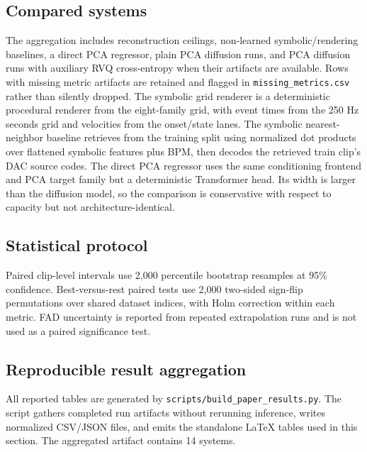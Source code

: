 \subsection{Compared systems}
The aggregation includes reconstruction ceilings, non-learned symbolic/rendering baselines, a direct PCA regressor, plain PCA diffusion runs, and PCA diffusion runs with auxiliary RVQ cross-entropy when their artifacts are available. Rows with missing metric artifacts are retained and flagged in \texttt{missing\_metrics.csv} rather than silently dropped.
The symbolic grid renderer is a deterministic procedural renderer from the eight-family grid, with event times from the 250 Hz seconds grid and velocities from the onset/state lanes. The symbolic nearest-neighbor baseline retrieves from the training split using normalized dot products over flattened symbolic features plus BPM, then decodes the retrieved train clip's DAC source codes.
The direct PCA regressor uses the same conditioning frontend and PCA target family but a deterministic Transformer head. Its width is larger than the diffusion model, so the comparison is conservative with respect to capacity but not architecture-identical.

\subsection{Statistical protocol}
Paired clip-level intervals use 2,000 percentile bootstrap resamples at 95\% confidence. Best-versus-rest paired tests use 2,000 two-sided sign-flip permutations over shared dataset indices, with Holm correction within each metric. FAD uncertainty is reported from repeated extrapolation runs and is not used as a paired significance test.

\subsection{Reproducible result aggregation}
All reported tables are generated by \texttt{scripts/build\_paper\_results.py}. The script gathers completed run artifacts without rerunning inference, writes normalized CSV/JSON files, and emits the standalone \LaTeX{} tables used in this section. The aggregated artifact contains 14 systems.
